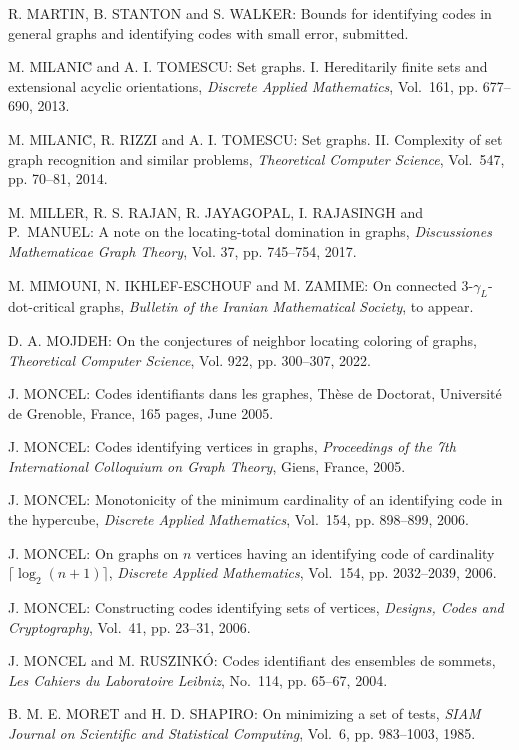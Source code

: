 \begin{thebibliography}{999}
R. MARTIN, B. STANTON and S. WALKER: Bounds for identifying codes in general graphs and  identifying codes with small error, submitted.

M. MILANI\u{C} and A. I. TOMESCU: Set graphs. I. Hereditarily finite sets and extensional acyclic orientations, {\it Discrete Applied Mathematics}, Vol.~161, pp. 677--690, 2013.

M. MILANI\u{C}, R. RIZZI and A. I. TOMESCU: Set graphs. II. Complexity of set graph recognition and similar problems, {\it Theoretical Computer Science}, Vol.~547, pp. 70--81, 2014.

M. MILLER, R. S. RAJAN, R. JAYAGOPAL, I. RAJASINGH and P.~MA\-NUEL: A note on the locating-total domination in graphs, {\it Discussiones Mathematicae Graph Theory}, Vol. 37, pp. 745--754, 2017.

M. MIMOUNI, N. IKHLEF-ESCHOUF and M. ZAMIME: On connected 3-$\gamma_L$-dot-critical graphs, {\it Bulletin of the Iranian Mathematical Society}, to appear.

D. A. MOJDEH: On the conjectures of neighbor locating coloring of graphs, {\it Theoretical Computer Science}, Vol. 922, pp. 300--307, 2022.

J. MONCEL: Codes identifiants dans les graphes, Th\`ese de
Doctorat, Universit\'e de Grenoble, France, 165 pages, June 2005.

J. MONCEL: Codes identifying vertices in graphs, {\it Proceedings of the 7th International Colloquium on Graph Theory}, Giens, France, 2005.

J. MONCEL: Monotonicity of the minimum cardinality of an identifying code in the hypercube, {\it Discrete Applied Mathematics}, Vol.~154, pp. 898--899, 2006.

J. MONCEL: On graphs on $n$ vertices having an identifying code of cardinality $\lceil \log_2 (n+1)\rceil$, {\it Discrete Applied Mathematics}, Vol.~154, pp. 2032--2039, 2006.

J. MONCEL: Constructing codes identifying sets of vertices, {\it Designs, Codes and Cryptography}, Vol.~41, pp. 23--31, 2006.

J. MONCEL and M. RUSZINK\'O: Codes identifiant des ensembles de sommets, {\it Les Cahiers du Laboratoire Leibniz}, No.~114, pp. 65--67, 2004.

B. M. E. MORET and H. D. SHAPIRO: On minimizing a set of tests, {\it SIAM Journal on Scientific and Statistical Computing}, Vol.~6, pp. 983--1003, 1985. 


\end{thebibliography}
